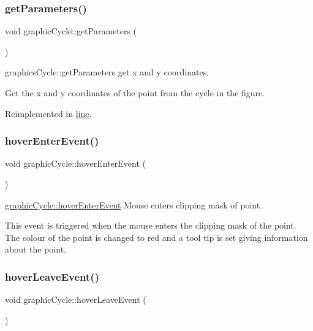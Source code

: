 \subsubsection{\texorpdfstring{get\+Parameters()}{getParameters()}}
{\footnotesize\ttfamily void graphic\+Cycle\+::get\+Parameters (\begin{DoxyParamCaption}{ }\end{DoxyParamCaption})\hspace{0.3cm}{\ttfamily [virtual]}}



graphics\+Cycle\+::get\+Parameters get x and y coordinates. 

Get the x and y coordinates of the point from the cycle in the figure. 

Reimplemented in \mbox{\hyperlink{classline_a6453a1483e1cf2ae4f565fd7f80516fc}{line}}.

\mbox{\label{classgraphic_cycle_a8ca1f30ff1886a901041d890ba7a97fc}} 
\subsubsection{\texorpdfstring{hover\+Enter\+Event()}{hoverEnterEvent()}}
{\footnotesize\ttfamily void graphic\+Cycle\+::hover\+Enter\+Event (\begin{DoxyParamCaption}\item[{Q\+Graphics\+Scene\+Hover\+Event $\ast$}]{ }\end{DoxyParamCaption})}



\mbox{\hyperlink{classgraphic_cycle_a8ca1f30ff1886a901041d890ba7a97fc}{graphic\+Cycle\+::hover\+Enter\+Event}} Mouse enters clipping mask of point. 

This event is triggered when the mouse enters the clipping mask of the point. The colour of the point is changed to red and a tool tip is set giving information about the point. \mbox{\label{classgraphic_cycle_aa9aee0ce2a2448da8fd54766c086ec9a}} 
\subsubsection{\texorpdfstring{hover\+Leave\+Event()}{hoverLeaveEvent()}}
{\footnotesize\ttfamily void graphic\+Cycle\+::hover\+Leave\+Event (\begin{DoxyParamCaption}\item[{Q\+Graphics\+Scene\+Hover\+Event $\ast$}]{ }\end{DoxyParamCaption})}



